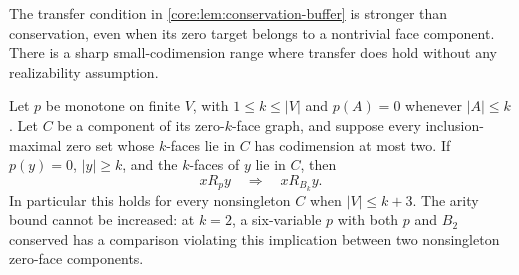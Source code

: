 The transfer condition in \cref{core:lem:conservation-buffer} is stronger
than conservation, even when its zero target belongs to a nontrivial
face component. There is a sharp small-codimension range where transfer
does hold without any realizability assumption.

\begin{proposition}
\label{core:prop:zero-face-transfer-limit}
Let $p$ be monotone on finite $V$, with $1\leq k\leq|V|$ and
$p(A)=0$ whenever $|A|\leq k$.
Let $C$ be a component of its zero-$k$-face graph, and suppose every
inclusion-maximal zero set whose $k$-faces lie in $C$ has codimension
at most two. If $p(y)=0$, $|y|\geq k$, and the $k$-faces of $y$ lie
in $C$, then
\[
 xR_py\quad\Longrightarrow\quad xR_{B_k}y.
\]
In particular this holds for every nonsingleton $C$ when $|V|\leq k+3$.
The arity bound cannot be increased: at $k=2$, a six-variable $p$ with
both $p$ and $B_2$ conserved has a comparison violating this implication
between two nonsingleton zero-face components.
\end{proposition}
